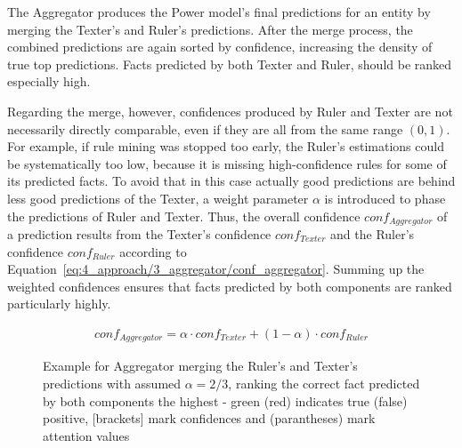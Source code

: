 The Aggregator produces the Power model's final predictions for an entity by merging the Texter's and Ruler's predictions. After the merge process, the combined predictions are again sorted by confidence, increasing the density of true top predictions. Facts predicted by both Texter and Ruler, should be ranked especially high.

Regarding the merge, however, confidences produced by Ruler and Texter are not necessarily directly comparable, even if they are all from the same range $(0, 1)$. For example, if rule mining was stopped too early, the Ruler's estimations could be systematically too low, because it is missing high-confidence rules for some of its predicted facts. To avoid that in this case actually good predictions are behind less good predictions of the Texter, a weight parameter $\alpha$ is introduced to phase the predictions of Ruler and Texter. Thus, the overall confidence $conf_{Aggregator}$ of a prediction results from the Texter's confidence $conf_{Texter}$ and the Ruler's confidence $conf_{Ruler}$ according to Equation~\ref{eq:4_approach/3_aggregator/conf_aggregator}. Summing up the weighted confidences ensures that facts predicted by both components are ranked particularly highly.

\begin{align}
    conf_{Aggregator} = \alpha \cdot conf_{Texter} + (1 - \alpha) \cdot conf_{Ruler}
    \label{eq:4_approach/3_aggregator/conf_aggregator}
\end{align}

\begin{figure}[t]
    \caption{Example for Aggregator merging the Ruler's and Texter's predictions with assumed $\alpha = 2/3$, ranking the correct fact predicted by both components the highest - green (red) indicates true (false) positive, [brackets] mark confidences and (parantheses) mark attention values}
    \label{fig:4_approach/3_aggregator/lucy}
\end{figure}


